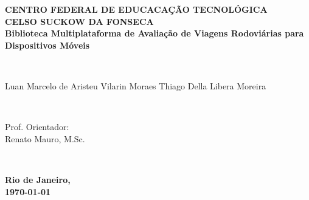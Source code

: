 \documentclass[12pt]{report} %
\begin{document}
	
	\thispagestyle{empty} %
	\center %
	
	\begin{minipage}{\textwidth}
		\begin{center}
			{\bfseries \large CENTRO FEDERAL DE EDUCACAÇÃO TECNOLÓGICA\\ CELSO SUCKOW DA FONSECA}\\[16em]
			{\bfseries \LARGE Biblioteca Multiplataforma de Avaliação de Viagens Rodoviárias para Dispositivos Móveis}
		\end{center}
	\end{minipage}\\[6em]
	
	\begin{flushright}
		\begin{minipage}{0.5\textwidth}
			\normalsize
			\raggedleft \normalsize Luan Marcelo de Aristeu Vilarin Moraes
			\raggedleft \normalsize Thiago Della Libera Moreira
		\end{minipage}\\[6em]

	\end{flushright}
	
	\begin{flushright}
		\begin{minipage}{0.5\textwidth}
			\raggedleft
			Prof. Orientador:\\
			Renato Mauro, M.Sc.
		\end{minipage}\\
	\end{flushright}
	\vfill	
	{\bfseries \large Rio de Janeiro,\\
		\today} %
	
	\pagebreak
	
	
\end{document}
